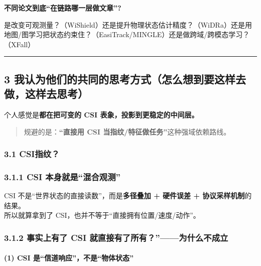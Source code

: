 \documentclass[
]{article}
\begin{document}
\textbf{不同论文到底``在链路哪一层做文章''?}

是改变可观测量？（WiShield）还是提升物理状态估计精度？（WiDRa）还是用地图/图学习把状态约束住？（EasiTrack/MINGLE）还是做跨域/跨模态学习？（XFall）

\begin{center}\rule{0.5\linewidth}{0.5pt}\end{center}

\subsection{3
我认为他们的共同的思考方式（怎么想到要这样去做，这样去思考）}\label{3-ux6211ux8ba4ux4e3aux4ed6ux4eecux7684ux5171ux540cux7684ux601dux8003ux65b9ux5f0fux600eux4e48ux60f3ux5230ux8981ux8fd9ux6837ux53bbux505aux8fd9ux6837ux53bbux601dux8003}

个人感觉是\textbf{都在把可变的 CSI 表象，投影到更稳定的中间层。}

\begin{quote}
规避的是：\textbf{``直接用 CSI 当指纹/特征做任务''}这种强域依赖路线。
\end{quote}

\subsubsection{3.1 CSI指纹？}\label{31-csiux6307ux7eb9}

\subsubsection{3.1.1 CSI
本身就是``混合观测''}\label{311-csi-ux672cux8eabux5c31ux662fux6df7ux5408ux89c2ux6d4b}

CSI 不是``世界状态的直接读数''，而是\textbf{多径叠加 + 硬件误差 +
协议采样机制}的结果。\\
所以就算拿到了 CSI，也并不等于``直接拥有位置/速度/动作''。

\subsubsection{3.1.2 事实上有了 CSI
就直接有了所有？''------为什么不成立}\label{312-ux4e8bux5b9eux4e0aux6709ux4e86-csi-ux5c31ux76f4ux63a5ux6709ux4e86ux6240ux6709------ux4e3aux4ec0ux4e48ux4e0dux6210ux7acb}

\paragraph{(1) CSI
是``信道响应''，不是``物体状态''}\label{1-csi-ux662fux4fe1ux9053ux54cdux5e94ux4e0dux662fux7269ux4f53ux72b6ux6001}
\end{document}
